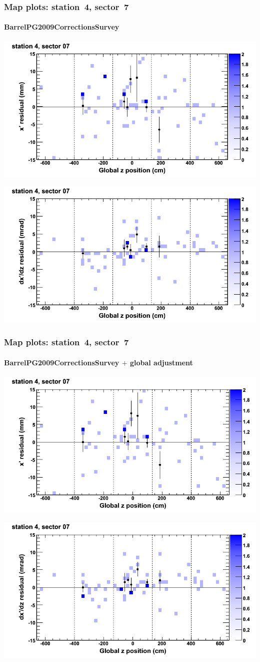 \documentclass[compress]{beamer}
\begin{document}
\begin{frame}
\frametitle{Map plots: station~4, sector~7}
\framesubtitle{BarrelPG2009CorrectionsSurvey}
\includegraphics[width=0.5\linewidth]{mapplots_01/DTvsz_st4sec07_x.png}

\includegraphics[width=0.5\linewidth]{mapplots_01/DTvsz_st4sec07_dxdz.png}
\end{frame}
\begin{frame}
\frametitle{Map plots: station~4, sector~7}
\framesubtitle{BarrelPG2009CorrectionsSurvey $+$ global adjustment}
\includegraphics[width=0.5\linewidth]{mapplots_re01/DTvsz_st4sec07_x.png}

\includegraphics[width=0.5\linewidth]{mapplots_re01/DTvsz_st4sec07_dxdz.png}
\end{frame}
\end{document}

